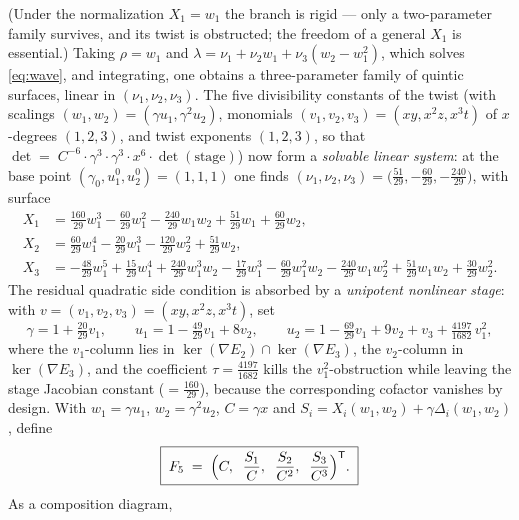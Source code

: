 \documentclass[11pt]{article}
\theoremstyle{plain}
\theoremstyle{definition}
\theoremstyle{remark}
\begin{document}
(Under the normalization $X_1=w_1$
the branch is rigid --- only a two-parameter family survives, and its twist is
obstructed; the freedom of a general $X_1$ is essential.) Taking $\rho=w_1$ and
$\lambda=\nu_1+\nu_2w_1+\nu_3(w_2-w_1^2)$, which solves \eqref{eq:wave}, and
integrating, one obtains a three-parameter family of quintic surfaces, linear
in $(\nu_1,\nu_2,\nu_3)$.
The five divisibility constants of the twist (with scalings
$(w_1,w_2)=(\gamma u_1,\gamma^2u_2)$, monomials $(v_1,v_2,v_3)=(xy,x^2z,x^3t)$
of $x$-degrees $(1,2,3)$, and twist exponents $(1,2,3)$, so that
$\det=\;C^{-6}\cdot\gamma^3\cdot\gamma^3\cdot x^6\cdot\det(\text{stage})$)
now form a \emph{solvable linear system}: at the base point
$(\gamma_0,u_1^0,u_2^0)=(1,1,1)$ one finds
$(\nu_1,\nu_2,\nu_3)=\bigl(\tfrac{51}{29},-\tfrac{60}{29},-\tfrac{240}{29}\bigr)$,
with surface
\begin{align*}
X_1&=\tfrac{160}{29}w_1^3-\tfrac{60}{29}w_1^2-\tfrac{240}{29}w_1w_2+\tfrac{51}{29}w_1+\tfrac{60}{29}w_2,\\
X_2&=\tfrac{60}{29}w_1^4-\tfrac{20}{29}w_1^3-\tfrac{120}{29}w_2^2+\tfrac{51}{29}w_2,\\
X_3&=-\tfrac{48}{29}w_1^5+\tfrac{15}{29}w_1^4+\tfrac{240}{29}w_1^3w_2-\tfrac{17}{29}w_1^3-\tfrac{60}{29}w_1^2w_2-\tfrac{240}{29}w_1w_2^2+\tfrac{51}{29}w_1w_2+\tfrac{30}{29}w_2^2 .
\end{align*}
The residual quadratic side condition is absorbed by a \emph{unipotent nonlinear
stage}: with $v=(v_1,v_2,v_3)=(xy,x^2z,x^3t)$, set
\[
\gamma=1+\tfrac{20}{29}v_1,\qquad
u_1=1-\tfrac{49}{29}v_1+8v_2,\qquad
u_2=1-\tfrac{69}{29}v_1+9v_2+v_3+\tfrac{4197}{1682}\,v_1^2 ,
\]
where the $v_1$-column lies in $\ker(\nabla E_2)\cap\ker(\nabla E_3)$, the
$v_2$-column in $\ker(\nabla E_3)$, and the coefficient $\tau=\tfrac{4197}{1682}$
kills the $v_1^2$-obstruction while leaving the stage Jacobian constant
($=\tfrac{160}{29}$), because the corresponding cofactor vanishes by design.
With $w_1=\gamma u_1$, $w_2=\gamma^2u_2$, $C=\gamma x$ and
$S_i=X_i(w_1,w_2)+\gamma\Delta_i(w_1,w_2)$, define
\[
\boxed{\;F_5\;=\;\Bigl(C,\;\;\frac{S_1}{C},\;\;\frac{S_2}{C^2},\;\;\frac{S_3}{C^3}\Bigr)^{\mathsf T}.\;}
\]
As a composition diagram,
\end{document}
